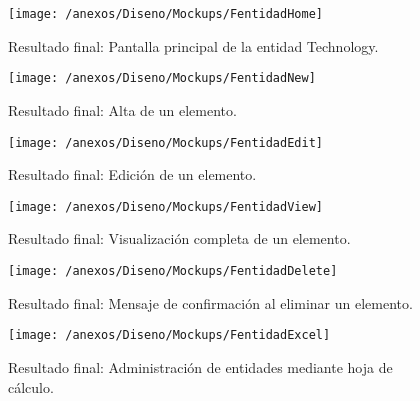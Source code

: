 \begin{figure}[h]
	\centering
	\texttt{[image: /anexos/Diseno/Mockups/FentidadHome]}
	\caption{Resultado final: Pantalla principal de la entidad Technology.}
	\label{img:FentidadHome}
\end{figure}

\begin{figure}[h]
	\centering
	\texttt{[image: /anexos/Diseno/Mockups/FentidadNew]}
	\caption{Resultado final: Alta de un elemento.}
	\label{img:FentidadNew}
\end{figure}

\begin{figure}[h]
	\centering
	\texttt{[image: /anexos/Diseno/Mockups/FentidadEdit]}
	\caption{Resultado final: Edición de un elemento.}
	\label{img:FentidadEdit}
\end{figure}

\begin{figure}[h]
	\centering
	\texttt{[image: /anexos/Diseno/Mockups/FentidadView]}
	\caption{Resultado final: Visualización completa de un elemento.}
	\label{img:FentidadView}
\end{figure}

\begin{figure}[h]
	\centering
	\texttt{[image: /anexos/Diseno/Mockups/FentidadDelete]}
	\caption{Resultado final: Mensaje de confirmación al eliminar un elemento.}
	\label{img:FentidadDelete}
\end{figure}

\begin{figure}[h]
	\centering
	\texttt{[image: /anexos/Diseno/Mockups/FentidadExcel]}
	\caption{Resultado final: Administración de entidades mediante hoja de cálculo.}
	\label{img:FentidadExcel}
\end{figure}